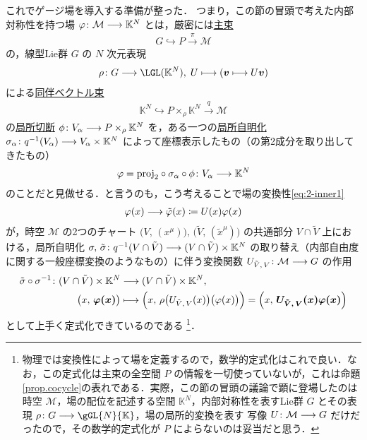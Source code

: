 \documentclass[TQFT_main]{subfiles}
\begin{document}
これでゲージ場を導入する準備が整った．
つまり，この節の冒頭で考えた内部対称性を持つ場 $\varphi \colon \mathcal{M} \longrightarrow \mathbb{K}^N$ とは，厳密には\hyperref[def.PFD]{主束}
\begin{align}
    G \hookrightarrow P \xrightarrow{\pi} \mathcal{M}
\end{align}
の，線型Lie群 $G$ の $N$ 次元表現
\begin{align}
    \rho \colon G \lto \LGL (\mathbb{K}^N),\; U \lmto (\bm{v} \lmto U\bm{v})
\end{align}
による\hyperref[def:associated-vect]{同伴ベクトル束}
\begin{align}
    \mathbb{K}^N \hookrightarrow P \times_\rho \mathbb{K}^N \xrightarrow{q} \mathcal{M}
\end{align}
の\hyperref[def.section]{局所切断} $\phi \colon V_\alpha \longrightarrow P \times_\rho \mathbb{K}^N$ を，ある一つの\hyperref[def.fiber-1]{局所自明化} $\sigma_\alpha \colon q^{-1}(V_\alpha) \longrightarrow V_\alpha \times \mathbb{K}^N$ によって座標表示したもの（の第2成分を取り出してきたもの）
\begin{align}
    \varphi = \mathrm{proj}_2 \circ \sigma_\alpha \circ \phi \colon V_\alpha \longrightarrow \mathbb{K}^N
\end{align}
のことだと見做せる．と言うのも，こう考えることで場の変換性\eqref{eq:2-inner1}
\begin{align}
    \varphi(x) \longrightarrow \tilde{\varphi}(x) \coloneqq U(x) \varphi (x)
\end{align}
が，時空 $\mathcal{M}$ の2つのチャート $\bigl(V,\, (x^\mu)\bigr),\, \bigl(\tilde{V},\, (\tilde{x}^\mu)\bigr)$ の共通部分 $V \cap \tilde{V}$ 上における，局所自明化 $\sigma,\, \tilde{\sigma} \colon q^{-1} (V \cap \tilde{V}) \longrightarrow (V \cap \tilde{V}) \times \mathbb{K}^N$ の取り替え（内部自由度に関する一般座標変換のようなもの）に伴う変換関数 $U_{\tilde{V},\, V} \colon \mathcal{M} \longrightarrow G$ の作用
\begin{align}
    \tilde{\sigma} \circ \sigma^{-1} \colon (V \cap \tilde{V}) \times \mathbb{K}^N &\longrightarrow (V \cap \tilde{V}) \times \mathbb{K}^N, \\
    \bigl(x,\, \bm{\varphi(x)}\bigr) &\longmapsto \Bigl(x,\, \rho\bigl(U_{\tilde{V},\, V}(x)\bigr)\bigl( \varphi(x) \bigr) \Bigr) = \Bigl( x,\, \bm{U_{\tilde{V},\, V} (x) \varphi(x)} \Bigr) \label{eq:field-locsym}
\end{align}
として上手く定式化できているのである
\footnote{
    物理では変換性によって場を定義するので，数学的定式化はこれで良い．なお，この定式化は主束の全空間 $P$ の情報を一切使っていないが，これは命題\ref{prop.cocycle}の表れである．実際，この節の冒頭の議論で顕に登場したのは時空 $\mathcal{M}$，場の配位を記述する空間 $\mathbb{K}^N$，内部対称性を表すLie群 $G$ とその表現 $\rho \colon G \lto \gGL{N}{\mathbb{K}}$，場の局所的変換を表す \cinfty 写像 $U \colon \mathcal{M} \longrightarrow G$ だけだったので，その数学的定式化が $P$ によらないのは妥当だと思う．
}．
\end{document}
